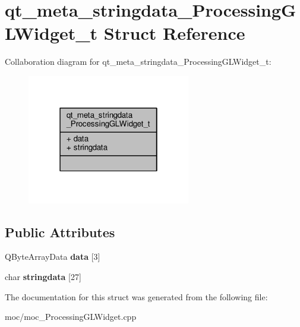 \hypertarget{structqt__meta__stringdata___processing_g_l_widget__t}{\section{qt\-\_\-meta\-\_\-stringdata\-\_\-\-Processing\-G\-L\-Widget\-\_\-t Struct Reference}
\label{structqt__meta__stringdata___processing_g_l_widget__t}
}


Collaboration diagram for qt\-\_\-meta\-\_\-stringdata\-\_\-\-Processing\-G\-L\-Widget\-\_\-t\-:
\nopagebreak
\begin{figure}[H]
\begin{center}
\leavevmode
\includegraphics[width=202pt]{structqt__meta__stringdata___processing_g_l_widget__t__coll__graph}
\end{center}
\end{figure}
\subsection*{Public Attributes}
\begin{DoxyCompactItemize}
\item 
\hypertarget{structqt__meta__stringdata___processing_g_l_widget__t_ae8bdc120fee9290c565eeaaf222b3231}{Q\-Byte\-Array\-Data {\bfseries data} \mbox{[}3\mbox{]}}\label{structqt__meta__stringdata___processing_g_l_widget__t_ae8bdc120fee9290c565eeaaf222b3231}

\item 
\hypertarget{structqt__meta__stringdata___processing_g_l_widget__t_ac1e4d32a0f981f0c36606ea0b445a4f1}{char {\bfseries stringdata} \mbox{[}27\mbox{]}}\label{structqt__meta__stringdata___processing_g_l_widget__t_ac1e4d32a0f981f0c36606ea0b445a4f1}

\end{DoxyCompactItemize}


The documentation for this struct was generated from the following file\-:\begin{DoxyCompactItemize}
\item 
moc/moc\-\_\-\-Processing\-G\-L\-Widget.\-cpp\end{DoxyCompactItemize}
